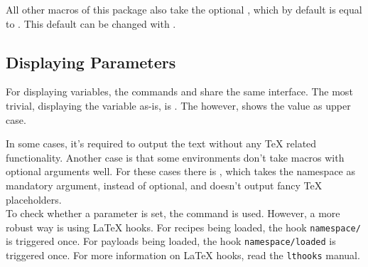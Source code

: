 \documentclass{ltxdoc}
\begin{document}
    All other macros of this package also take the optional , which by default is equal to \cmd{\jobname}.
    \DescribeMacro{\setnamespace} This default  can be changed with \cmd{\setnamespace}.\\

    \subsection{Displaying Parameters}
    For displaying variables, the commands \cmd{\param} and \cmd{\PARAM} share the same interface.
    \DescribeMacro{\param} The most trivial, displaying the variable as-is, is \cmd{\param}.
    \DescribeMacro{\PARAM} The \cmd{\PARAM} however, shows the value as upper case.

    In some cases, it's required to output the text without any \TeX{} related functionality.
    Another case is that some environments don't take macros with optional arguments well.
    \DescribeMacro{\rawparam} For these cases there is \cmd{\rawparam}, which takes the namespace as mandatory argument, instead of optional, and doesn't output fancy \TeX{} placeholders.\\

    \DescribeMacro{\hasparam} To check whether a parameter is set, the \cmd{\hasparam} command is used.
    However, a more robust way is using \LaTeX{} hooks.
    For recipes being loaded, the hook \texttt{namespace/} is triggered once.
    For payloads being loaded, the hook \texttt{namespace/}\texttt{loaded} is triggered once.
    For more information on \LaTeX{} hooks, read the \texttt{lthooks} manual.

    \clearpage
\end{document}
